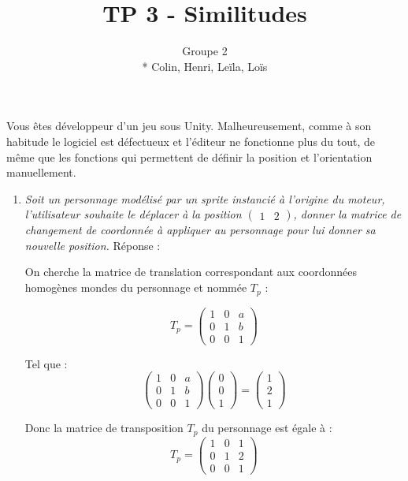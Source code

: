 \documentclass[a4paper,12pt]{article}
\title{TP 3 - Similitudes}
\author{Groupe 2 \\* Colin, Henri, Leïla, Loïs}
\begin{document}
\maketitle

Vous êtes développeur d'un jeu sous Unity. Malheureusement, comme à son habitude le logiciel est défectueux et l'éditeur ne fonctionne plus du tout, de même que les fonctions qui permettent de définir la position et l'orientation manuellement. 
\begin{enumerate}
    \item \emph{Soit un personnage modélisé par un sprite instancié à l'origine du moteur, l'utilisateur souhaite le déplacer à la position $\begin{pmatrix} 1 & 2\end{pmatrix}$, donner la matrice de changement de coordonnée à appliquer au personnage pour lui donner sa nouvelle position.}\label{exo:1.1}\newline \newline
Réponse :

On cherche la matrice de translation correspondant aux coordonnées homogènes mondes du personnage et nommée $T_p$ : 

 \begin{equation}
T_p = 
\begin{pmatrix}
1 & 0 & a \\
0 & 1 & b \\
0 & 0 & 1
\end{pmatrix} \end{equation}

Tel que : 
 \begin{equation}\begin{pmatrix}
1 & 0 & a \\
0 & 1 & b \\
0 & 0 & 1
\end{pmatrix}
\begin{pmatrix}
0 \\
0 \\
1 
\end{pmatrix}
=
\begin{pmatrix}
1 \\
2 \\
1
\end{pmatrix} \end{equation}

Donc la matrice de transposition $T_p$ du personnage est égale à :
 \begin{equation}\boxed{
T_p = 
\begin{pmatrix}
1 & 0 & 1 \\
0 & 1 & 2 \\
0 & 0 & 1
\end{pmatrix}} \end{equation} \newline


\end{enumerate}
\end{document}

